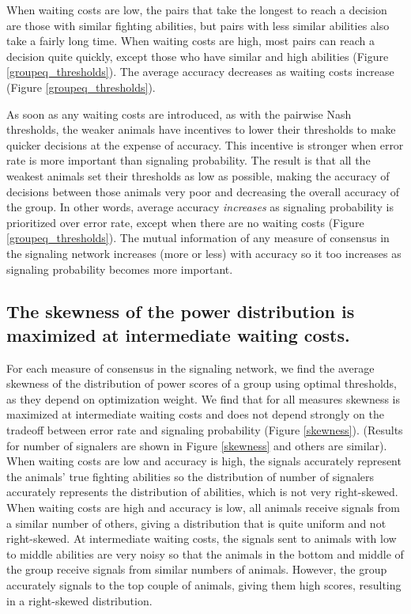 \documentclass{article}
\begin{document}
When waiting costs are low, the pairs that take the longest to reach a decision are those with similar fighting abilities, but pairs with less similar abilities also take a fairly long time.  When waiting costs are high, most pairs can reach a decision quite quickly, except those who have similar and high abilities (Figure \ref{groupeq_thresholds}).  The average accuracy decreases as waiting costs increase (Figure \ref{groupeq_thresholds}).  

As soon as any waiting costs are introduced, as with the pairwise Nash thresholds, the weaker animals have incentives to lower their thresholds to make quicker decisions at the expense of accuracy.  This incentive is stronger when error rate is more important than signaling probability.  The result is that all the weakest animals set their thresholds as low as possible, making the accuracy of decisions between those animals very poor and decreasing the overall accuracy of the group. In other words, average accuracy \emph{increases} as signaling probability is prioritized over error rate, except when there are no waiting costs (Figure \ref{groupeq_thresholds}). The mutual information of any measure of consensus in the signaling network increases (more or less) with accuracy so it too increases as signaling probability becomes more important.  

\subsection{The skewness of the power distribution is maximized at intermediate waiting costs.  }
For each measure of consensus in the signaling network, we find the average skewness of the distribution of power scores of a group using optimal thresholds, as they depend on optimization weight.  We find that for all measures skewness is maximized at intermediate waiting costs and does not depend strongly on the tradeoff between error rate and signaling probability (Figure \ref{skewness}). (Results for number of signalers are shown in Figure \ref{skewness} and others are similar).  When waiting costs are low and accuracy is high, the signals accurately represent the animals' true fighting abilities so the distribution of number of signalers accurately represents the distribution of abilities, which is not very right-skewed.  When waiting costs are high and accuracy is low, all animals receive signals from a similar number of others, giving a distribution that is quite uniform and not right-skewed.  At intermediate waiting costs, the signals sent to animals with low to middle abilities are very noisy so that the animals in the bottom and middle of the group receive signals from similar numbers of animals.  However, the group accurately signals to the top couple of animals, giving them high scores, resulting in a right-skewed distribution. 
\end{document}
